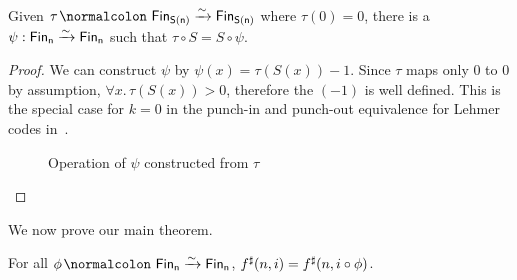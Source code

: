 \begin{lemma}\label{bag:punch}
    Given $\tau\colon \Fin[S(n)]\xto{\sim}\Fin[S(n)]$ where $\tau(0) = 0$,
    there is a $\psi : \Fin[n] \xto{\sim} \Fin[n]$ such that $\tau \circ S = S \circ \psi$.
\end{lemma}

\begin{proof}
    We can construct $\psi$ by $\psi(x) = \tau(S(x)) - 1$.
    Since $\tau$ maps only 0 to 0 by assumption, $\forall x. \, \tau(S(x)) > 0$, therefore
    the $(- 1)$ is well defined. This is the special case for $k = 0$ in the punch-in and punch-out
    equivalence for Lehmer codes in~\cite{choudhurySymmetriesReversibleProgramming2022}.

    \begin{figure}[H]
        \centering
        \hspace{1em}
        \caption{Operation of $\psi$ constructed from $\tau$}
        \label{fig:enter-label}
    \end{figure}
\end{proof}

We now prove our main theorem.

\begin{theorem}\label{bag:perm-sat}
    For all $\phi\colon \Fin[n]\xto{\sim}\Fin[n]$, $\ext{f}(n, i) \id \ext{f}(n, i \circ \phi)$.
\end{theorem}

